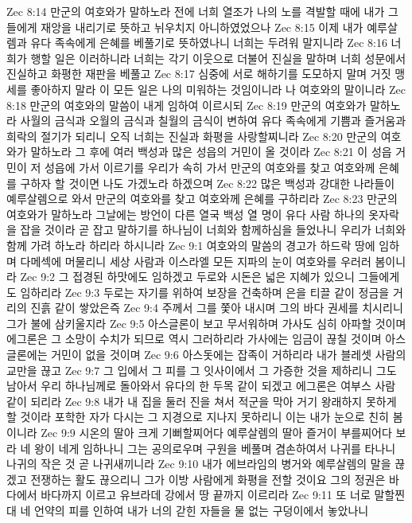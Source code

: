 Zec 8:14  만군의 여호와가 말하노라 전에 너희 열조가 나의 노를 격발할 때에 내가 그들에게 재앙을 내리기로 뜻하고 뉘우치지 아니하였었으나
Zec 8:15  이제 내가 예루살렘과 유다 족속에게 은혜를 베풀기로 뜻하였나니 너희는 두려워 말지니라
Zec 8:16  너희가 행할 일은 이러하니라 너희는 각기 이웃으로 더불어 진실을 말하며 너희 성문에서 진실하고 화평한 재판을 베풀고
Zec 8:17  심중에 서로 해하기를 도모하지 말며 거짓 맹세를 좋아하지 말라 이 모든 일은 나의 미워하는 것임이니라 나 여호와의 말이니라
Zec 8:18  만군의 여호와의 말씀이 내게 임하여 이르시되
Zec 8:19  만군의 여호와가 말하노라 사월의 금식과 오월의 금식과 칠월의 금식이 변하여 유다 족속에게 기쁨과 즐거움과 희락의 절기가 되리니 오직 너희는 진실과 화평을 사랑할찌니라
Zec 8:20  만군의 여호와가 말하노라 그 후에 여러 백성과 많은 성읍의 거민이 올 것이라
Zec 8:21  이 성읍 거민이 저 성읍에 가서 이르기를 우리가 속히 가서 만군의 여호와를 찾고 여호와께 은혜를 구하자 할 것이면 나도 가겠노라 하겠으며
Zec 8:22  많은 백성과 강대한 나라들이 예루살렘으로 와서 만군의 여호와를 찾고 여호와께 은혜를 구하리라
Zec 8:23  만군의 여호와가 말하노라 그날에는 방언이 다른 열국 백성 열 명이 유다 사람 하나의 옷자락을 잡을 것이라 곧 잡고 말하기를 하나님이 너희와 함께하심을 들었나니 우리가 너희와 함께 가려 하노라 하리라 하시니라
Zec 9:1  여호와의 말씀의 경고가 하드락 땅에 임하며 다메섹에 머물리니 세상 사람과 이스라엘 모든 지파의 눈이 여호와를 우러러 봄이니라
Zec 9:2  그 접경된 하맛에도 임하겠고 두로와 시돈은 넓은 지혜가 있으니 그들에게도 임하리라
Zec 9:3  두로는 자기를 위하여 보장을 건축하며 은을 티끌 같이 정금을 거리의 진흙 같이 쌓았은즉
Zec 9:4  주께서 그를 쫓아 내시며 그의 바다 권세를 치시리니 그가 불에 삼키울지라
Zec 9:5  아스글론이 보고 무서워하며 가사도 심히 아파할 것이며 에그론은 그 소망이 수치가 되므로 역시 그러하리라 가사에는 임금이 끊칠 것이며 아스글론에는 거민이 없을 것이며
Zec 9:6  아스돗에는 잡족이 거하리라 내가 블레셋 사람의 교만을 끊고
Zec 9:7  그 입에서 그 피를 그 잇사이에서 그 가증한 것을 제하리니 그도 남아서 우리 하나님께로 돌아와서 유다의 한 두목 같이 되겠고 에그론은 여부스 사람 같이 되리라
Zec 9:8  내가 내 집을 둘러 진을 쳐서 적군을 막아 거기 왕래하지 못하게 할 것이라 포학한 자가 다시는 그 지경으로 지나지 못하리니 이는 내가 눈으로 친히 봄이니라
Zec 9:9  시온의 딸아 크게 기뻐할찌어다 예루살렘의 딸아 즐거이 부를찌어다 보라 네 왕이 네게 임하나니 그는 공의로우며 구원을 베풀며 겸손하여서 나귀를 타나니 나귀의 작은 것 곧 나귀새끼니라
Zec 9:10  내가 에브라임의 병거와 예루살렘의 말을 끊겠고 전쟁하는 활도 끊으리니 그가 이방 사람에게 화평을 전할 것이요 그의 정권은 바다에서 바다까지 이르고 유브라데 강에서 땅 끝까지 이르리라
Zec 9:11  또 너로 말할찐대 네 언약의 피를 인하여 내가 너의 갇힌 자들을 물 없는 구덩이에서 놓았나니
